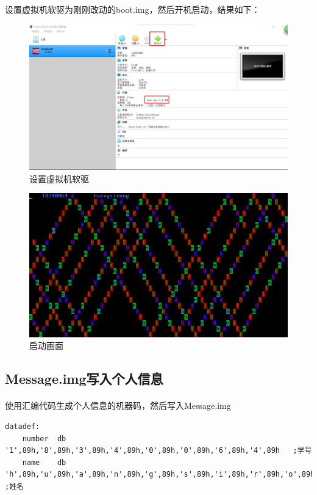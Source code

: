 \documentclass[12pt]{article}
\begin{document}
设置虚拟机软驱为刚刚改动的boot.img，然后开机启动，结果如下：
	\begin{figure}[H]
			\centering
			\includegraphics[width=14cm]{./figures/bootpc.png}
			\caption{设置虚拟机软驱} 
		\end{figure}	

	\begin{figure}[H]
			\centering
			\includegraphics[width=14cm]{./figures/result.png}
			\caption{启动画面} 
		\end{figure}	

\subsection{\Large Message.img写入个人信息}
\paragraph{}\quad 使用汇编代码生成个人信息的机器码，然后写入Message.img
\begin{lstlisting}
datadef:
    number  db	'1',89h,'8',89h,'3',89h,'4',89h,'0',89h,'0',89h,'6',89h,'4',89h   ;学号
    name	db 'h',89h,'u',89h,'a',89h,'n',89h,'g',89h,'s',89h,'i',89h,'r',89h,'o',89h,'n',89h,'g',89h ;姓名
\end{lstlisting}
\end{document}
